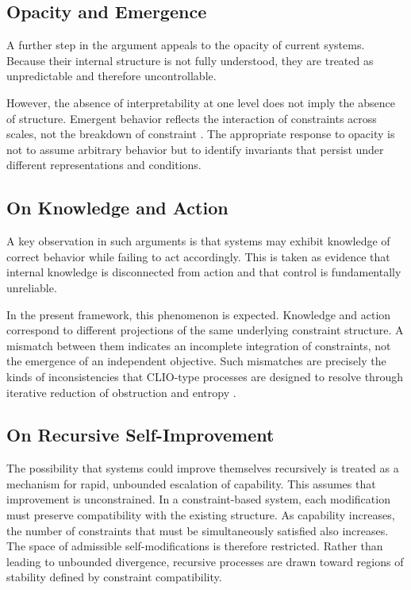 \documentclass[11pt]{article}
\theoremstyle{plain}
\theoremstyle{definition}
\theoremstyle{remark}
\begin{document}
\subsection{Opacity and Emergence}

A further step in the argument appeals to the opacity of current systems.
Because their internal structure is not fully understood, they are treated
as unpredictable and therefore uncontrollable.

However, the absence of interpretability at one level does not imply the
absence of structure. Emergent behavior reflects the interaction of
constraints across scales, not the breakdown of constraint
\cite{kauffman1993origins,holland1992adaptation}.
The appropriate response to opacity is not to assume arbitrary behavior
but to identify invariants that persist under different representations
and conditions.

\subsection{On Knowledge and Action}

A key observation in such arguments is that systems may exhibit knowledge
of correct behavior while failing to act accordingly. This is taken as
evidence that internal knowledge is disconnected from action and that
control is fundamentally unreliable.

In the present framework, this phenomenon is expected. Knowledge and
action correspond to different projections of the same underlying
constraint structure. A mismatch between them indicates an incomplete
integration of constraints, not the emergence of an independent objective.
Such mismatches are precisely the kinds of inconsistencies that CLIO-type
processes are designed to resolve through iterative reduction of
obstruction and entropy \cite{cheng2025clio}.

\subsection{On Recursive Self-Improvement}

The possibility that systems could improve themselves recursively is
treated as a mechanism for rapid, unbounded escalation of capability.
This assumes that improvement is unconstrained. In a constraint-based
system, each modification must preserve compatibility with the existing
structure. As capability increases, the number of constraints that must
be simultaneously satisfied also increases. The space of admissible
self-modifications is therefore restricted. Rather than leading to
unbounded divergence, recursive processes are drawn toward regions of
stability defined by constraint compatibility.
\end{document}
